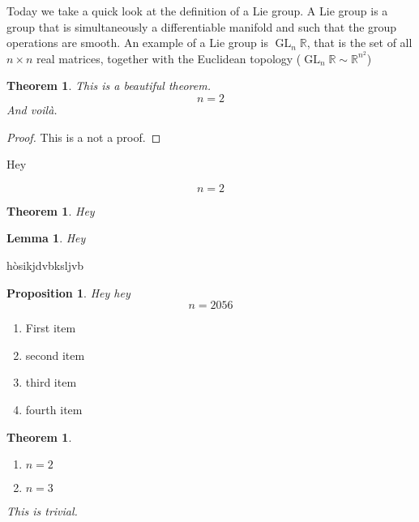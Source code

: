 \documentclass[a4paper, 12pt]{article}
\theoremstyle{definition}
\theoremstyle{plain}
\newtheorem{theorem}[definition]{Theorem}
\newtheorem{proposition}[definition]{Proposition}
\newtheorem{lemma}[definition]{Lemma}
\theoremstyle{remark}
\begin{document}
Today we take a quick look at the definition of a Lie group. A Lie group is a group that is simultaneously a differentiable manifold and such that the group operations are smooth. An example of a Lie group is \( \operatorname{GL}_n \mathbb{R} \), that is the set of all \( n \times n \) real matrices, together with the Euclidean topology (\( \operatorname{GL}_n \mathbb{R} \sim \mathbb{R}^{n^2} \))

\begin{theorem}
    This is a beautiful theorem.
    \begin{equation}
        n = 2
    \end{equation}
    And voilà.
\end{theorem}

\begin{proof}
    This is a not a proof.
\end{proof}

Hey

\begin{equation}
    n = 2
\end{equation}

\begin{theorem}
    Hey
\end{theorem}

\begin{lemma}
    Hey
\end{lemma}

hòsikjdvbksljvb

\begin{proposition}
    Hey hey
    \begin{equation}
        n = 2056
    \end{equation}
\end{proposition}

\begin{enumerate}
    \item First item
    \item second item
    \item third item
    \item fourth item
\end{enumerate}

\begin{theorem}
    \begin{enumerate}
        \item \( n = 2 \)
        \item \( n = 3 \)
    \end{enumerate}
    This is trivial.
\end{theorem}
\end{document}
